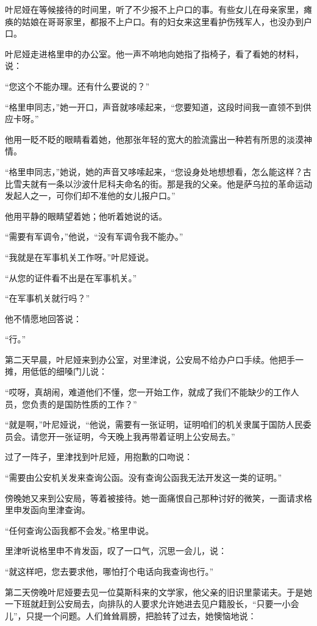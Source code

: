 叶尼娅在等候接待的时间里，听了不少报不上户口的事。有些女儿在母亲家里，瘫痪的姑娘在哥哥家里，都报不上户口。有的妇女来这里看护伤残军人，也没办到户口。

叶尼娅走进格里申的办公室。他一声不响地向她指了指椅子，看了看她的材料，说：

“您这个不能办理。还有什么要说的？”

“格里申同志，”她一开口，声音就哆嗦起来，“您要知道，这段时间我一直领不到供应卡呀。”

他用一眨不眨的眼睛看着她，他那张年轻的宽大的脸流露出一种若有所思的淡漠神情。

“格里申同志，”她说，她的声音又哆嗦起来，“您设身处地想想看，怎么能这样？古比雪夫就有一条以沙波什尼科夫命名的街。那是我的父亲。他是萨乌拉的革命运动发起人之一，可你们却不准他的女儿报户口。”

他用平静的眼睛望着她；他听着她说的话。

“需要有军调令，”他说，“没有军调令我不能办。”

“我就是在军事机关工作呀。”叶尼娅说。

“从您的证件看不出是在军事机关。”

“在军事机关就行吗？”

他不情愿地回答说：

“行。”

第二天早晨，叶尼娅来到办公室，对里津说，公安局不给办户口手续。他把手一摊，用低低的细嗓门儿说：

“哎呀，真胡闹，难道他们不懂，您一开始工作，就成了我们不能缺少的工作人员，您负责的是国防性质的工作？”

“就是啊，”叶尼娅说，“他说，需要有一张证明，证明咱们的机关隶属于国防人民委员会。请您开一张证明，今天晚上我再带着证明上公安局去。”

过了一阵子，里津找到叶尼娅，用抱歉的口吻说：

“需要由公安机关发来查询公函。没有查询公函我无法开发这一类的证明。”

傍晚她又来到公安局，等着被接待。她一面痛恨自己那种讨好的微笑，一面请求格里申发函向里津查询。

“任何查询公函我都不会发。”格里申说。

里津听说格里申不肯发函，叹了一口气，沉思一会儿，说：

“就这样吧，您去要求他，哪怕打个电话向我查询也行。”

第二天傍晚叶尼娅要去见一位莫斯科来的文学家，他父亲的旧识里蒙诺夫。于是她一下班就赶到公安局去，向排队的人要求允许她进去见户籍股长，“只要一小会儿”，只提一个问题。人们耸耸肩膀，把脸转了过去，她懊恼地说：

